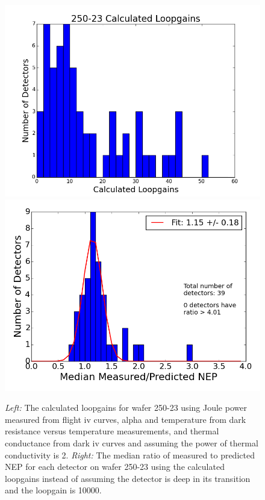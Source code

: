 

\begin{figure}[ht!]
\begin{center}
\includegraphics[width=0.4\columnwidth]{figures/250-23_calculated_loopgains_histogram.png}
\includegraphics[width=0.4\columnwidth]{figures/250-23_meas_pred_ratios_obsc_calculated_loopgain.png}
\caption{{\it Left:} The calculated loopgains for wafer 250-23 using Joule power measured from flight iv curves, alpha and temperature from dark resistance versus temperature measurements, and thermal conductance from dark iv curves and assuming the power of thermal conductivity is 2. {\it Right:} The median ratio of measured to predicted \ac{NEP} for each detector on wafer 250-23 using the calculated loopgains instead of assuming the detector is deep in its transition and the loopgain is 10000.}
\label{fig:loopgain_histogram}
\end{center}
\end{figure}


